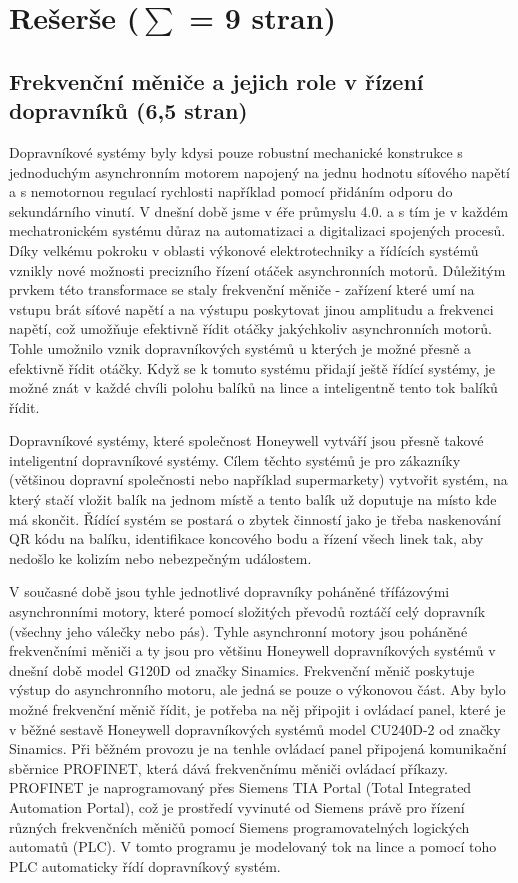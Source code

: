 \chapter{Rešerše ($\sum$ = 9 stran)} \label{chap:Rešerše}
\section{Frekvenční měniče a jejich role v řízení dopravníků (6,5 stran)}\label{sec:FrekvencniMeniceAJejichRole}

Dopravníkové systémy byly kdysi pouze robustní mechanické konstrukce s jednoduchým asynchronním motorem napojený na jednu hodnotu síťového napětí a s nemotornou regulací rychlosti například pomocí přidáním odporu do sekundárního vinutí. V dnešní době jsme v éře průmyslu 4.0. a s tím je v každém mechatronickém systému důraz na automatizaci a digitalizaci spojených procesů. Díky velkému pokroku v oblasti výkonové elektrotechniky a řídících systémů vznikly nové možnosti precizního řízení otáček asynchronních motorů. Důležitým prvkem této transformace se staly frekvenční měniče - zařízení které umí na vstupu brát síťové napětí a na výstupu poskytovat jinou amplitudu a frekvenci napětí, což umožňuje efektivně řídit otáčky jakýchkoliv asynchronních motorů. Tohle umožnilo vznik dopravníkových systémů u kterých je možné přesně a efektivně řídit otáčky. Když se k tomuto systému přidají ještě řídící systémy, je možné znát v každé chvíli polohu balíků na lince a inteligentně tento tok balíků řídit.

Dopravníkové systémy, které společnost Honeywell vytváří jsou přesně takové inteligentní dopravníkové systémy. Cílem těchto systémů je pro zákazníky (většinou dopravní společnosti nebo například supermarkety) vytvořit systém, na který stačí vložit balík na jednom místě a tento balík už doputuje na místo kde má skončit. Řídící systém se postará o zbytek činností jako je třeba naskenování QR kódu na balíku, identifikace koncového bodu a řízení všech linek tak, aby nedošlo ke kolizím nebo nebezpečným událostem.

V současné době jsou tyhle jednotlivé dopravníky poháněné třífázovými asynchronními motory, které pomocí složitých převodů roztáčí celý dopravník (všechny jeho válečky nebo pás). Tyhle asynchronní motory jsou poháněné frekvenčními měniči a ty jsou pro většinu Honeywell dopravníkových systémů v dnešní době model G120D od značky Sinamics. Frekvenční měnič poskytuje výstup do asynchronního motoru, ale jedná se pouze o výkonovou část. Aby bylo možné frekvenční měnič řídit, je potřeba na něj připojit i ovládací panel, které je v běžné sestavě Honeywell dopravníkových systémů model CU240D-2 od značky Sinamics. Při běžném provozu je na tenhle ovládací panel připojená komunikační sběrnice PROFINET, která dává frekvenčnímu měniči ovládací příkazy. PROFINET je naprogramovaný přes Siemens TIA Portal (Total Integrated Automation Portal), což je prostředí vyvinuté od Siemens právě pro řízení různých frekvenčních měničů pomocí Siemens programovatelných logických automatů (PLC). V tomto programu je modelovaný tok na lince a pomocí toho PLC automaticky řídí dopravníkový systém.
\cite{SinamicsG120D}

